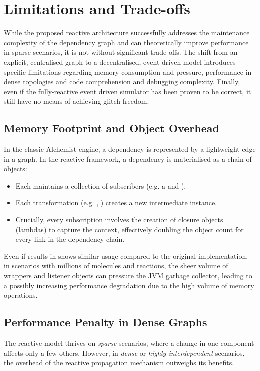 \section{Limitations and Trade-offs}
\label{sec:limitations}

While the proposed reactive architecture successfully addresses the maintenance
complexity of the dependency graph and can theoretically improve performance in
sparse scenarios, it is not without significant trade-offs. The shift from an
explicit, centralised graph to a decentralised, event-driven model introduces
specific limitations regarding memory consumption and pressure, performance in
dense topologies and code comprehension and debugging complexity. Finally, even
if the fully-reactive event driven simulator has been proven to be correct, it
still have no means of achieving glitch freedom.

\subsection{Memory Footprint and Object Overhead}
In the classic Alchemist engine, a dependency is represented by a
lightweight edge in a graph. In the reactive framework, a dependency is
materialised as a chain of objects:
\begin{itemize}
	\item Each  maintains a collection of subscribers (e.g.
	      a  and ).
	\item Each transformation (e.g. , ) creates a
	      new intermediate  instance.
	\item Crucially, every subscription involves the creation of closure
	      objects (lambdas) to capture the context, effectively doubling the
	      object count for every link in the dependency chain.
\end{itemize}
Even if results in  shows similar usage compared to the
original implementation, in scenarios with millions of molecules and reactions,
the sheer volume of  wrappers and listener objects can
pressure the \ac{JVM} garbage collector, leading to a possibly increasing
performance degradation due to the high volume of memory operations.

\subsection{Performance Penalty in Dense Graphs}
The reactive model thrives on \emph{sparse} scenarios, where a change in one
component affects only a few others. However, in \emph{dense} or \emph{highly
	interdependent} scenarios, the overhead of the reactive propagation mechanism
outweighs its benefits.

